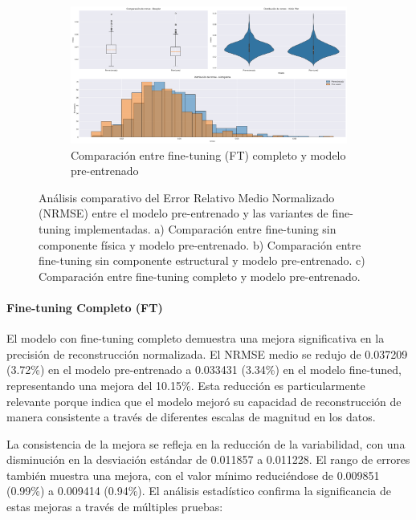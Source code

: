 \begin{figure}[H]
    \begin{subfigure}[b]{0.7\textwidth}
        \centering
        \includegraphics[width=\textwidth]{Images/comparison_plots_nrmse_sup.png}
        \caption{Comparación entre fine-tuning (FT) completo y modelo pre-entrenado}
        \label{fig:nrmse_box}
    \end{subfigure}
    
    \caption{Análisis comparativo del Error Relativo Medio Normalizado (NRMSE) entre el modelo pre-entrenado y las variantes de fine-tuning implementadas. a) Comparación entre fine-tuning sin componente física y modelo pre-entrenado. b) Comparación entre fine-tuning sin componente estructural y modelo pre-entrenado. c) Comparación entre fine-tuning completo y modelo pre-entrenado.}
    \label{fig:nrmse_analysis}
\end{figure}



\paragraph{Fine-tuning Completo (FT)}
El modelo con fine-tuning completo demuestra una mejora significativa en la precisión de reconstrucción normalizada. El NRMSE medio se redujo de 0.037209 (3.72\%) en el modelo pre-entrenado a 0.033431 (3.34\%) en el modelo fine-tuned, representando una mejora del 10.15\%. Esta reducción es particularmente relevante porque indica que el modelo mejoró su capacidad de reconstrucción de manera consistente a través de diferentes escalas de magnitud en los datos.

La consistencia de la mejora se refleja en la reducción de la variabilidad, con una disminución en la desviación estándar de 0.011857 a 0.011228. El rango de errores también muestra una mejora, con el valor mínimo reduciéndose de 0.009851 (0.99\%) a 0.009414 (0.94\%). El análisis estadístico confirma la significancia de estas mejoras a través de múltiples pruebas:

